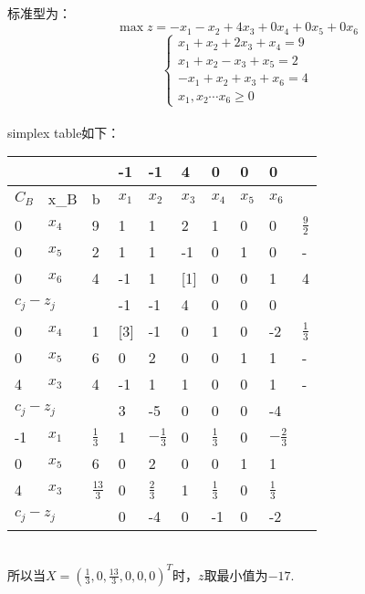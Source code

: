 \documentclass[12pt]{article}
\begin{document}
\section{}
\quad \\
标准型为：
\[\max z=-x_1-x_2+4x_3+0x_4+0x_5+0x_6\]
\[
\left\{\begin{array}{l}
    x_1+x_2+2x_3+x_4=9\\
    x_1+x_2-x_3+x_5=2\\
    -x_1+x_2+x_3+x_6=4\\
    x_1,x_2 \cdots x_6 \geqslant 0   
\end{array}\right.
\]
\\
simplex table如下：
{
\begin{table}[h]
    \centering
    \begin{tabular}{lll|llllll|l}
    \multicolumn{3}{l|}{}                              & -1 & -1 & 4  & 0 & 0 & 0  &  \\ \hline
    \multicolumn{1}{l|}{$C_B$} & \multicolumn{1}{l|}{x_B} & b & $x_1$ & $x_2$ & $x_3$ & $x_4$ & $x_5$ & $x_6$ &  \\ \hline
    \multicolumn{1}{l|}{0} & \multicolumn{1}{l|}{$x_4$} & 9 & 1  & 1  & 2  & 1 & 0 & 0  & $\frac{9}{2}$ \\
    \multicolumn{1}{l|}{0} & \multicolumn{1}{l|}{$x_5$} & 2 & 1  & 1  & -1 & 0 & 1 & 0  & - \\
    \multicolumn{1}{l|}{0} & \multicolumn{1}{l|}{$x_6$} & 4 & -1 & 1  & [1]  & 0 & 0 & 1  & 4 \\ \hline
    \multicolumn{3}{l|}{$c_j-z_j$}                              & -1 & -1 & 4  & 0 & 0 & 0  &  \\ \hline
    \multicolumn{1}{l|}{0} & \multicolumn{1}{l|}{$x_4$} & 1 & [3]  & -1 & 0  & 1 & 0 & -2 & $\frac{1}{3}$ \\
    \multicolumn{1}{l|}{0} & \multicolumn{1}{l|}{$x_5$} & 6 & 0  & 2  & 0  & 0 & 1 & 1  & - \\
    \multicolumn{1}{l|}{4} & \multicolumn{1}{l|}{$x_3$} & 4 & -1 & 1  & 1  & 0 & 0 & 1  & - \\ \hline
    \multicolumn{3}{l|}{$c_j-z_j$}                              & 3  & -5 & 0  & 0 & 0 & -4 &  \\ \hline
    \multicolumn{1}{l|}{-1} & \multicolumn{1}{l|}{$x_1$} & $\frac{1}{3}$ & 1   &  $-\frac{1}{3}$  &  0  &  $\frac{1}{3}$ & 0  &  $-\frac{2}{3}$  &  \\
    \multicolumn{1}{l|}{0} &  \multicolumn{1}{l|}{$x_5$} & 6 &  0  &   2 &   0 &  0 &  1 &  1  &  \\
    \multicolumn{1}{l|}{4} &  \multicolumn{1}{l|}{$x_3$}& $\frac{13}{3}$  &  0  &  $\frac{2}{3}$  &  1  & $\frac{1}{3}$  &  0 &  $\frac{1}{3}$  &  \\ \hline
    \multicolumn{3}{l|}{$c_j-z_j$}                              &  0  &  -4  &   0 &  -1 &  0 &  -2  &  \\ \hline
    \end{tabular}
    \end{table}
}\\
所以当$X=(\frac{1}{3},0,\frac{13}{3},0,0,0)^{T}$时，$z$取最小值为$-17$.
\end{document}

